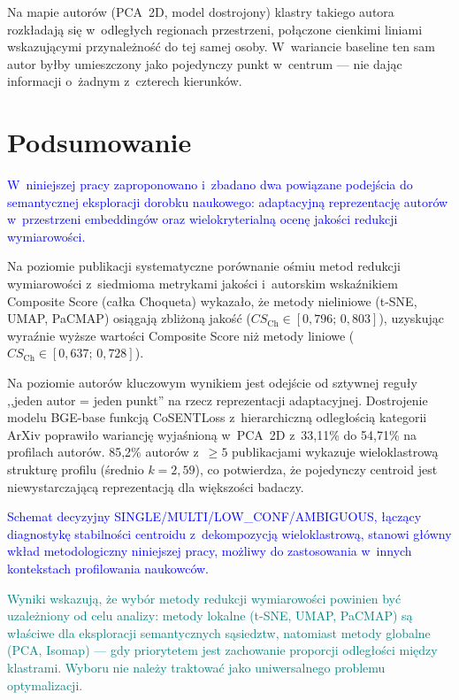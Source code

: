 \documentclass[a4paper,11pt,twocolumn]{article}
\newcommand{\hl}[1]{\textcolor{blue}{#1}}
\newcommand{\hlme}[1]{\textcolor{teal}{#1}}
\begin{document}
Na mapie autorów (PCA~2D, model dostrojony) klastry takiego autora
rozkładają się w~odległych regionach przestrzeni, połączone cienkimi
liniami wskazującymi przynależność do tej samej osoby. W~wariancie
baseline ten sam autor byłby umieszczony jako pojedynczy punkt
w~centrum --- nie dając informacji o~żadnym z~czterech kierunków.


\section{Podsumowanie}
\label{sec:concl}

\hl{W~niniejszej pracy zaproponowano i~zbadano dwa powiązane podejścia
do semantycznej eksploracji dorobku naukowego: adaptacyjną reprezentację
autorów w~przestrzeni embeddingów oraz wielokryterialną ocenę jakości
redukcji wymiarowości.}

Na poziomie publikacji systematyczne porównanie ośmiu metod redukcji
wymiarowości z~siedmioma metrykami jakości i~autorskim wskaźnikiem
Composite Score (całka Choqueta) wykazało, że metody nieliniowe
(t-SNE, UMAP, PaCMAP) osiągają zbliżoną jakość
($CS_\text{Ch} \in [0{,}796;\,0{,}803]$), uzyskując wyraźnie wyższe
wartości Composite Score niż metody liniowe
($CS_\text{Ch} \in [0{,}637;\,0{,}728]$).

Na poziomie autorów kluczowym wynikiem jest odejście od sztywnej reguły
,,jeden autor = jeden punkt'' na rzecz reprezentacji adaptacyjnej.
Dostrojenie modelu BGE-base funkcją CoSENTLoss z~hierarchiczną
odległością kategorii ArXiv poprawiło wariancję wyjaśnioną w~PCA~2D
z~33,11\% do 54,71\% na profilach autorów. 85,2\% autorów
z~$\geq 5$ publikacjami wykazuje wieloklastrową strukturę profilu
(średnio $k=2{,}59$), co potwierdza, że pojedynczy centroid jest
niewystarczającą reprezentacją dla większości badaczy.

\hl{Schemat decyzyjny SINGLE/MULTI/LOW\_CONF/AMBIGUOUS, łączący
diagnostykę stabilności centroidu z~dekompozycją wieloklastrową,
stanowi główny wkład metodologiczny niniejszej pracy, możliwy do
zastosowania w~innych kontekstach profilowania naukowców.}

\hlme{Wyniki wskazują, że wybór metody redukcji wymiarowości powinien
być uzależniony od celu analizy: metody lokalne (t-SNE, UMAP, PaCMAP)
są właściwe dla eksploracji semantycznych sąsiedztw, natomiast metody
globalne (PCA, Isomap) --- gdy priorytetem jest zachowanie proporcji
odległości między klastrami. Wyboru nie należy traktować jako
uniwersalnego problemu optymalizacji.}
\end{document}

